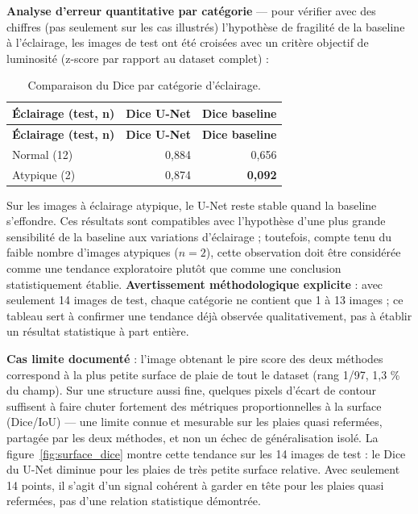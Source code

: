 \documentclass[12pt,a4paper]{report}
\begin{document}
\textbf{Analyse d'erreur quantitative par catégorie} --- pour vérifier avec des chiffres (pas seulement sur les cas illustrés) l'hypothèse de fragilité de la baseline à l'éclairage, les images de test ont été croisées avec un critère objectif de luminosité (z-score par rapport au dataset complet) :

\begin{longtable}{l r r}
\caption{Comparaison du Dice par catégorie d'éclairage.}
\label{tab:eclairage} \\
\toprule
\textbf{Éclairage (test, n)} & \textbf{Dice U-Net} & \textbf{Dice baseline} \\
\midrule
\endfirsthead
\toprule
\textbf{Éclairage (test, n)} & \textbf{Dice U-Net} & \textbf{Dice baseline} \\
\midrule
\endhead
Normal (12) & 0,884 & 0,656 \\
Atypique (2) & 0,874 & \textbf{0,092} \\
\bottomrule
\end{longtable}

Sur les images à éclairage atypique, le U-Net reste stable quand la baseline s'effondre. Ces résultats sont compatibles avec l'hypothèse d'une plus grande sensibilité de la baseline aux variations d'éclairage ; toutefois, compte tenu du faible nombre d'images atypiques ($n=2$), cette observation doit être considérée comme une tendance exploratoire plutôt que comme une conclusion statistiquement établie. \textbf{Avertissement méthodologique explicite} : avec seulement 14 images de test, chaque catégorie ne contient que 1 à 13 images ; ce tableau sert à confirmer une tendance déjà observée qualitativement, pas à établir un résultat statistique à part entière.

\textbf{Cas limite documenté} : l'image obtenant le pire score des deux méthodes correspond à la plus petite surface de plaie de tout le dataset (rang 1/97, 1,3 \% du champ). Sur une structure aussi fine, quelques pixels d'écart de contour suffisent à faire chuter fortement des métriques proportionnelles à la surface (Dice/IoU) --- une limite connue et mesurable sur les plaies quasi refermées, partagée par les deux méthodes, et non un échec de généralisation isolé. La figure~\ref{fig:surface_dice} montre cette tendance sur les 14 images de test : le Dice du U-Net diminue pour les plaies de très petite surface relative. Avec seulement 14 points, il s'agit d'un signal cohérent à garder en tête pour les plaies quasi refermées, pas d'une relation statistique démontrée.
\end{document}
